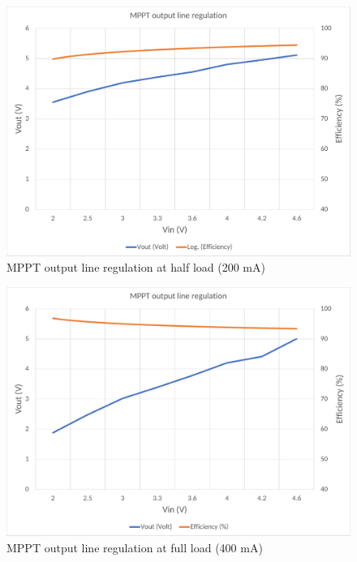 \begin{figure}[H]
	\centering
	\includegraphics[width=0.8\columnwidth]{IMGS/MPPT output line regulation at half load (200mA).pdf}
	\caption{MPPT output line regulation at half load (200 mA)}
	\label{fig:arch}
\end{figure}



\begin{figure}[h]
	\centering
	\includegraphics[width=0.8\columnwidth]{IMGS/MPPT output line regulation at full load (400mA).pdf}
	\caption{MPPT output line regulation at full load (400 mA)}
	\label{fig:arch}
\end{figure}








